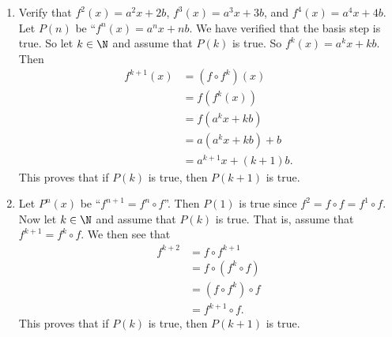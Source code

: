 \begin{enumerate}
\begin{enumerate}
\item Verify that $f^2(x) = a^2x + 2b$, $f^3(x) = a^3x + 3b$, and $f^4(x) = a^4x + 4b$.  Let $P(n)$ be ``$f^n(x) = a^nx + nb$.  We have verified that the basis step is true.  So let $k \in \N$ and assume that $P(k)$ is true.  So $f^k(x) = a^kx + kb$.  Then
\begin{align*}
f^{k+1}(x) &= \left( f \circ f^k \right)(x) \\
           &= f \left( f^k(x) \right) \\
           &= f\left(a^kx + kb \right) \\
           &= a\left(a^kx + kb \right) + b \\
           &= a^{k+1}x + (k + 1)b.
\end{align*}
This proves that if $P(k)$ is true, then $P(k + 1)$ is true.

\item Let $P^n(x)$ be ``$f^{n+1} = f^n \circ f$''.  Then $P(1)$ is true since 
$f^2 = f \circ f = f^1 \circ f$.  Now let $k \in \N$ and assume that $P(k)$ is true.  That is, assume that $f^{k+1} = f^k \circ f$.  We then see that
\begin{align*}
f^{k+2} &= f \circ f^{k+1} \\
        &= f \circ \left( f^k \circ f \right) \\
        &= \left( f \circ f^k \right) \circ f \\
        &= f^{k+1} \circ f.
\end{align*}
This proves that if $P(k)$ is true, then $P(k + 1)$ is true.
\end{enumerate}
\end{enumerate}
\hbreak


\endinput
